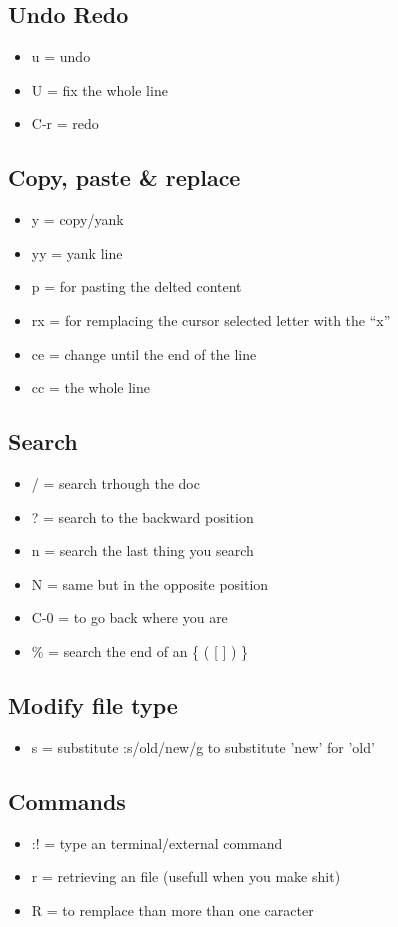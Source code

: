 \documentclass[11pt]{article}
\begin{document}
\subsection*{Undo Redo}
\label{sec:orgab3289d}
\begin{itemize}
\item u = undo
\item U = fix the whole line
\item C-r = redo
\end{itemize}
\subsection*{Copy, paste \& replace}
\label{sec:org4436449}
\begin{itemize}
\item y = copy/yank
\item yy = yank line
\item p = for pasting the delted content
\item rx = for remplacing the cursor selected letter with the ``x''
\item ce = change until the end of the line
\item cc = the whole line
\end{itemize}
\subsection*{Search}
\label{sec:org373a4f1}
\begin{itemize}
\item / = search trhough the doc
\item ? = search to the backward position
\item n = search the last thing you search
\item N = same but in the opposite position
\item C-0 = to go back where you are
\item \% = search the end of an \{ ( [ ] ) \}
\end{itemize}
\subsection*{Modify file type}
\label{sec:org9b5affd}
\begin{itemize}
\item s = substitute :s/old/new/g to substitute 'new' for 'old'
\end{itemize}
\subsection*{Commands}
\label{sec:orga95d127}
\begin{itemize}
\item :! = type an terminal/external command
\item r = retrieving an file (usefull when you make shit)
\item R = to remplace than more than one caracter
\end{itemize}
\end{document}
